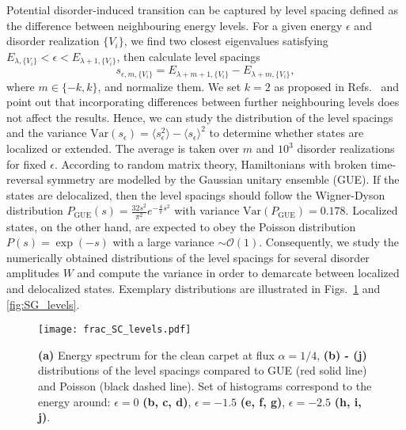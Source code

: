 Potential disorder-induced transition can be captured by level spacing defined as the difference between neighbouring energy levels. For a given energy $\epsilon$ and disorder realization $\{V_i\}$, we find two closest eigenvalues satisfying $ E_{\lambda, \{V_i\}} < \epsilon < E_{\lambda + 1, \{V_i\}}$, then calculate level spacings 
\begin{equation}
s_{\epsilon, m, \{V_i\}} = E_{\lambda + m + 1, \{V_i\}} - E_{\lambda + m, \{V_i\}}, 
\label{eq:levelspacing}
\end{equation}
where $m \in \lbrace -k, k \rbrace$, and normalize them. We set $k = 2$ as proposed in Refs.~\cite{2010:ProdanDisordCI, 2011:Prodan} and point out that incorporating differences between further neighbouring levels does not affect the results. Hence, we can study the distribution of the level spacings and the variance $\mathrm{Var} (s_{\epsilon}) = \langle s_{\epsilon}^2 \rangle - \langle s_{\epsilon} \rangle^2$ to determine whether states are localized or extended. The average is taken over $m$ and $10^3$ disorder realizations for fixed $\epsilon$. According to random matrix theory, Hamiltonians with broken time-reversal symmetry are modelled by the Gaussian unitary ensemble (GUE). If the states are delocalized, then the level spacings should follow the Wigner-Dyson distribution $P_{\mathrm{GUE}} (s) = \frac{32 s^2}{\pi^2} e^{-\frac{4}{\pi} s^2}$ with variance $\mathrm{Var}(P_{\mathrm{GUE}}) = 0.178$. Localized states, on the other hand, are expected to obey the Poisson distribution $P (s) = \exp (-s)$ with a large variance $ \sim \mathcal{O}(1)$. Consequently, we study the numerically obtained distributions of the level spacings for several disorder amplitudes $W$ and compute the variance in order to demarcate between localized and delocalized states. Exemplary distributions are illustrated in Figs.~\ref{fig:SC_levels} and \ref{fig:SG_levels}.

\begin{figure}[H]
\centering
\texttt{[image: frac\_SC\_levels.pdf]}
\caption[Distribution of level spacings for Sierpiński carpet at different disorder strengths]{\textbf{(a)} Energy spectrum for the clean carpet at flux $\alpha = 1/4$, \textbf{(b) - (j)} distributions of the level spacings compared to GUE (red solid line) and Poisson (black dashed line). Set of histograms correspond to the energy around: $\epsilon = 0$ \textbf{(b, c, d)}, $\epsilon = -1.5$  \textbf{(e, f, g)}, $\epsilon = -2.5$ \textbf{(h, i, j)}.}
\label{fig:SC_levels}
\end{figure}

